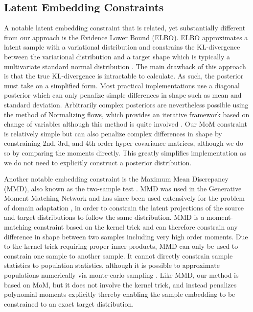 \documentclass[10pt,twocolumn,letterpaper]{article}
\begin{document}
\subsection{Latent Embedding Constraints}

A notable latent embedding constraint that is related, yet substantially different from our approach is the Evidence Lower Bound (ELBO).
ELBO approximates a latent sample with a variational distribution and constrains the KL-divergence between the variational distribution and a target shape which is typically a multivariate standard normal distribution \cite{kingma2013auto}. 
The main drawback of this approach is that the true KL-divergence is intractable to calculate.  
As such, the posterior must take on a simplified form. 
Most practical implementations use a diagonal posterior which can only penalize simple differences in shape such as mean and standard deviation.  
Arbitrarily complex posteriors are nevertheless possible using the method of Normalizing flows, which provides an iterative framework based on change of variables although this method is quite involved \cite{rezende2015variational,kingma2016improved,caterini2021variational}.  
Our MoM constraint is relatively simple but can also penalize complex differences in shape by constraining 2nd, 3rd, and 4th order hyper-covariance matrices, although we do so by comparing the moments directly.  
This greatly simplifies implementation as we do not need to explicitly construct a posterior distribution.

Another notable embedding constraint is the Maximum Mean Discrepancy (MMD), also known as the two-sample test \cite{gretton2007kernel}.  
MMD was used in the Generative Moment Matching Network \cite{li2015generative} and has since been used extensively for the problem of domain adaptation \cite{WANG2018135,Wang2023rethinking}, in order to constrain the latent projections of the source and target distributions to follow the same distribution.  
MMD is a moment-matching constraint based on the kernel trick and can therefore constrain any difference in shape between two samples including very high order moments. 
Due to the kernel trick requiring proper inner products, MMD can only be used to constrain one sample to another sample.  
It cannot directly constrain sample statistics to population statistics, although it is possible to approximate populations numerically via monte-carlo sampling \cite{zhao2019infovae}.  
Like MMD, our method is based on MoM, but it does not involve the kernel trick, and instead penalizes polynomial moments explicitly thereby enabling the sample embedding to be constrained to an exact target distribution.
\end{document}
